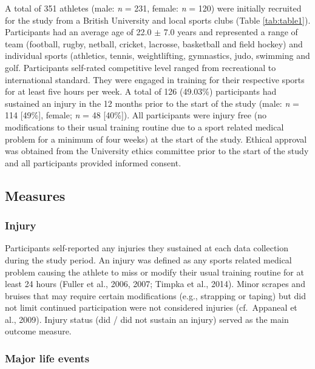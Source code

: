 \documentclass[
]{frontiersHLTH}
\begin{document}
A total of 351 athletes (male: \emph{n} = 231, female: \emph{n} = 120)
were initially recruited for the study from a British University and
local sports clubs (Table \ref{tab:table1}). Participants had an average
age of 22.0 \(\pm\) 7.0 years and represented a range of team (football,
rugby, netball, cricket, lacrosse, basketball and field hockey) and
individual sports (athletics, tennis, weightlifting, gymnastics, judo,
swimming and golf. Participants self-rated competitive level ranged from
recreational to international standard. They were engaged in training
for their respective sports for at least five hours per week. A total of
126 (49.03\%) participants had sustained an injury in the 12 months
prior to the start of the study (male: \emph{n} = 114 {[}49\%{]},
female; \emph{n} = 48 {[}40\%{]}). All participants were injury free (no
modifications to their usual training routine due to a sport related
medical problem for a minimum of four weeks) at the start of the study.
Ethical approval was obtained from the University ethics committee prior
to the start of the study and all participants provided informed
consent.

\hypertarget{measures}{%
\subsection{Measures}\label{measures}}

\hypertarget{injury}{%
\subsubsection{Injury}\label{injury}}

Participants self-reported any injuries they sustained at each data
collection during the study period. An injury was defined as any sports
related medical problem causing the athlete to miss or modify their
usual training routine for at least 24 hours (Fuller et al., 2006, 2007;
Timpka et al., 2014). Minor scrapes and bruises that may require certain
modifications (e.g., strapping or taping) but did not limit continued
participation were not considered injuries (cf.~Appaneal et al., 2009).
Injury status (did / did not sustain an injury) served as the main
outcome measure.

\hypertarget{major-life-events}{%
\subsubsection{Major life events}\label{major-life-events}}
\end{document}
